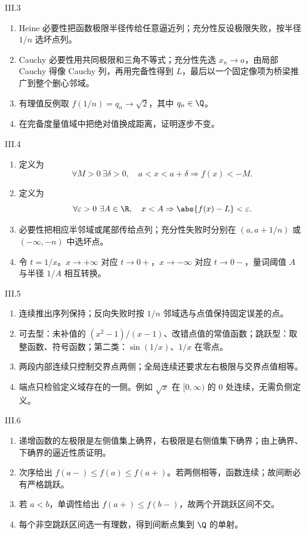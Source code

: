 \begin{solution}{III.3}
\begin{enumerate}
 \item Heine 必要性把函数极限半径传给任意逼近列；充分性反设极限失败，按半径 \(1/n\) 选坏点列。
 \item Cauchy 必要性用共同极限和三角不等式；充分性先选 \(x_n\to a\)，由局部 Cauchy 得像 Cauchy 列，再用完备性得到 \(L\)，最后以一个固定像项为桥梁推广到整个删心邻域。
 \item 有理值反例取 \(f(1/n)=q_n\to\sqrt2\)，其中 \(q_n\in\Q\)。
 \item 在完备度量值域中把绝对值换成距离，证明逐步不变。
\end{enumerate}
\end{solution}

\begin{solution}{III.4}
\begin{enumerate}
 \item 定义为
 \[
  \forall M>0\ \exists\delta>0,\quad
  a<x<a+\delta\Rightarrow f(x)<-M.
 \]
 \item 定义为
 \[
  \forall\varepsilon>0\ \exists A\in\R,\quad
  x<A\Rightarrow\abs{f(x)-L}<\varepsilon.
 \]
 \item 必要性把相应半邻域或尾部传给点列；充分性失败时分别在 \((a,a+1/n)\) 或 \((-\infty,-n)\) 中选坏点。
 \item 令 \(t=1/x\)。\(x\to+\infty\) 对应 \(t\to0+\)，\(x\to-\infty\) 对应 \(t\to0-\)，量词阈值 \(A\) 与半径 \(1/A\) 相互转换。
\end{enumerate}
\end{solution}

\begin{solution}{III.5}
\begin{enumerate}
 \item 连续推出序列保持；反向失败时按 \(1/n\) 邻域选与点值保持固定误差的点。
 \item 可去型：未补值的 \((x^2-1)/(x-1)\)、改错点值的常值函数；跳跃型：取整函数、符号函数；第二类：\(\sin(1/x)\)、\(1/x\) 在零点。
 \item 两段内部连续只控制交界点两侧；全局连续还要求左右极限与交界点值相等。
 \item 端点只检验定义域存在的一侧。例如 \(\sqrt x\) 在 \([0,\infty)\) 的 \(0\) 处连续，无需负侧定义。
\end{enumerate}
\end{solution}

\begin{solution}{III.6}
\begin{enumerate}
 \item 递增函数的左极限是左侧值集上确界，右极限是右侧值集下确界；由上确界、下确界的逼近性质证明。
 \item 次序给出 \(f(a-)\le f(a)\le f(a+)\)。若两侧相等，函数连续；故间断必有严格跳跃。
 \item 若 \(a<b\)，单调性给出 \(f(a+)\le f(b-)\)，故两个开跳跃区间不交。
 \item 每个非空跳跃区间选一有理数，得到间断点集到 \(\Q\) 的单射。
\end{enumerate}
\end{solution}

